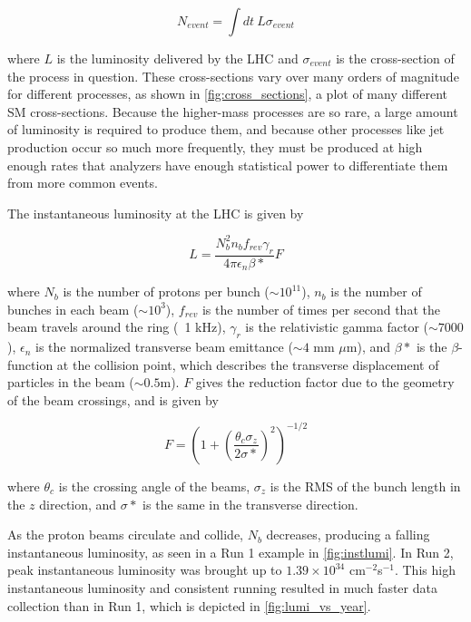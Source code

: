 \begin{equation}
N_{event} = \int dt\ L\sigma_{event}
\end{equation}

where $L$ is the luminosity delivered by the \ac{LHC} and $\sigma_{event}$ is the cross-section of the process in question. These cross-sections vary over many orders of magnitude for different processes, as shown in \autoref{fig:cross_sections}, a plot of many different \ac{SM} cross-sections. Because the higher-mass processes are so rare, a large amount of luminosity is required to produce them, and because other processes like jet production occur so much more frequently, they must be produced at high enough rates that analyzers have enough statistical power to differentiate them from more common events.   

The instantaneous luminosity at the \ac{LHC} is given by

\begin{equation}
L = \frac{ N^2_b n_b f_{rev} \gamma_r }{ 4\pi \epsilon_n \beta* } F
\end{equation}

where $N_b$ is the number of protons per bunch ($\sim10^{11}$), $n_b$ is the number of bunches in each beam ($\sim10^3$), $f_{rev}$ is the number of times per second that the beam travels around the ring (~1 kHz), $\gamma_r$ is the relativistic gamma factor ($\sim 7000$), $\epsilon_n$ is the normalized transverse beam emittance ($\sim 4$ mm $\mu$m), and $\beta*$ is the $\beta$-function at the collision point, which describes the transverse displacement of particles in the beam ($\sim 0.5$m). $F$ gives the reduction factor due to the geometry of the beam crossings, and is given by

\begin{equation}
F = (1+ (\frac{\theta_c \sigma_z}{2\sigma*})^2)^{-1/2}
\end{equation}

where $\theta_c$ is the crossing angle of the beams, $\sigma_z$ is the RMS of the bunch length in the $z$ direction, and $\sigma*$ is the same in the transverse direction.

As the proton beams circulate and collide, $N_b$ decreases, producing a falling instantaneous luminosity, as seen in a Run 1 example in \autoref{fig:instlumi}. In Run 2, peak instantaneous luminosity was brought up to $1.39 \times 10^{34}$ cm$^{-2}$s$^{-1}$. This high instantaneous luminosity and consistent running resulted in much faster data collection than in Run 1, which is depicted in \autoref{fig:lumi_vs_year}. 


